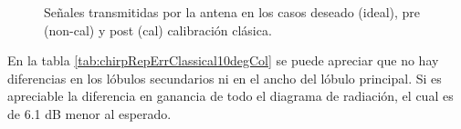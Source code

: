 \begin{figure}[H]
	\centering

	\caption{Señales transmitidas por la antena en los casos deseado (ideal), pre (non-cal) y post (cal) calibración clásica.}
	\label{fig:chirpRepErrClassical10degCol}
\end{figure}

En la tabla \ref{tab:chirpRepErrClassical10degCol} se puede apreciar que no hay diferencias en los lóbulos secundarios ni en el
ancho del lóbulo principal. Si es apreciable la diferencia en ganancia de todo el diagrama de radiación, el cual es de 6.1 dB
menor al esperado.

